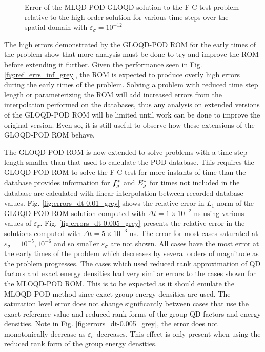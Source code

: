 	\begin{figure}[ht!]
		\centering
		\caption{\label{fig:ref_errs_domain_grey}
			Error of the MLQD-POD GLOQD solution to the F-C test problem relative to the high order solution for various time steps over the spatial domain with $\varepsilon_\sigma = 10^{-12}$}
	\end{figure}

	\ind The high errors demonstrated by the GLOQD-POD ROM for the early times of the problem show that more analysis must be done to try and improve the ROM before extending it further. Given the performance seen in Fig. \ref{fig:ref_errs_inf_grey}, the ROM is expected to produce overly high errors during the early times of the problem. Solving a problem with reduced time step length or parameterizing the ROM will add increased errors from the interpolation performed on the databases, thus any analysis on extended versions of the GLOQD-POD ROM will be limited until work can be done to improve the original version. Even so, it is still useful to observe how these extensions of the GLOQD-POD ROM behave. 
	
	\ind The GLOQD-POD ROM is now extended to solve problems with a time step length smaller than that used to calculate the POD database. This requires the GLOQD-POD ROM to solve the F-C test for more instants of time than the database provides information for $\bm{f}_g^*$ and $E_g^*$ for times not included in the database are calculated with linear interpolation between recorded database values. Fig. \ref{fig:errors_dt-0.01_grey} shows the  relative error in $L_1$-norm of the GLOQD-POD ROM solution computed with $\Delta t \! =  \! 1\! \times  \!  10^{-2}$ ns using various values of $\varepsilon_{\sigma}$. Fig. \ref{fig:errors_dt-0.005_grey}  presents the relative error in the solutions computed with $\Delta t \! = \! 5\! \times  \! 10^{-3}$ ns. The error for most cases saturated at $\varepsilon_\sigma = 10^{-5},10^{-6}$ and so smaller $\varepsilon_\sigma$ are not shown. All cases have the most error at the early times of the problem which decreases by several orders of magnitude as the problem progresses. The cases which used reduced rank approximation of QD factors and exact energy densities had very similar errors to the cases shown for the MLOQD-POD ROM. This is to be expected as it should emulate the MLOQD-POD method since exact group energy densities are used. The saturation level error does not change significantly between cases that use the exact reference value and reduced rank forms of the group QD factors and energy densities. Note in Fig. \ref{fig:errors_dt-0.005_grey}, the error does not monotonically decrease as $\varepsilon_\sigma$ decreases. This effect is only present when using the reduced rank form of the group energy densities.
	
